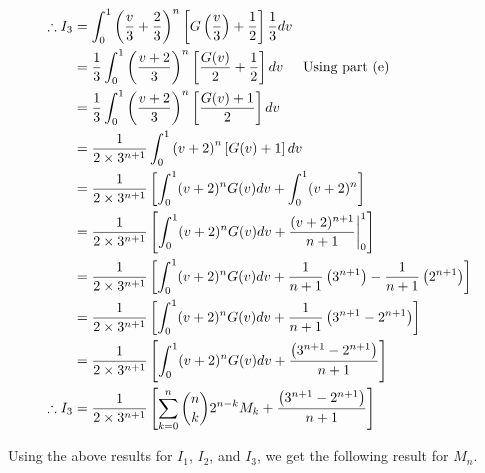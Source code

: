 \documentclass[a4paper]{article}
\begin{document}
\begin{enumerate}[label=\textbf{\arabic*.}]
\begin{enumerate}
		\begin{align*}
		\therefore I_3 & = \int_{0}^{1}\left(\frac{v}{3} + \frac{2}{3}\right)^{n}\left[G\left(\frac{v}{3}\right) + \frac{1}{2}\right]\frac{1}{3}dv\\
		& = \frac{1}{3}\int_{0}^{1}\left(\frac{v+2}{3}\right)^{n}\left[\frac{G(v)}{2} + \frac{1}{2}\right]dv \hspace{5mm} \text{Using part (e)}\\
		& = \frac{1}{3}\int_{0}^{1}\left(\frac{v+2}{3}\right)^{n}\left[\frac{G(v) + 1}{2}\right]dv\\
		& = \frac{1}{2\times3^{n+1}}\int_{0}^{1}\left(v+2\right)^{n}\left[G(v) + 1\right]dv\\
		& = \frac{1}{2\times3^{n+1}}\left[\int_{0}^{1}(v+2)^{n}G(v)dv + \int_{0}^{1}(v+2)^{n}\right]\\
		& = \frac{1}{2\times3^{n+1}}\left[\int_{0}^{1}(v+2)^{n}G(v)dv + \frac{(v+2)^{n+1}}{n+1} \bigg{|}_{0}^{1}\right]\\
		& = \frac{1}{2\times3^{n+1}}\left[\int_{0}^{1}(v+2)^{n}G(v)dv + \frac{1}{n+1}\left(3^{n+1}\right) - \frac{1}{n+1}\left(2^{n+1}\right)\right]\\
		& = \frac{1}{2\times3^{n+1}}\left[\int_{0}^{1}(v+2)^{n}G(v)dv + \frac{1}{n+1}\left(3^{n+1} - 2^{n+1}\right)\right]\\
		& = \frac{1}{2\times3^{n+1}}\left[\int_{0}^{1}(v+2)^{n}G(v)dv + \frac{\left(3^{n+1} - 2^{n+1}\right)}{n+1}\right]\\
		\therefore I_3 & = \frac{1}{2\times3^{n+1}}\left[\sum_{k=0}^{n}\binom{n}{k}2^{n-k}M_k + \frac{\left(3^{n+1} - 2^{n+1}\right)}{n+1}\right]\\
		\end{align*}

		\pagebreak

		Using the above results for $I_1$, $I_2$, and $I_3$, we get the following result for $M_n$.


\end{enumerate}
\end{enumerate}
\end{document}
